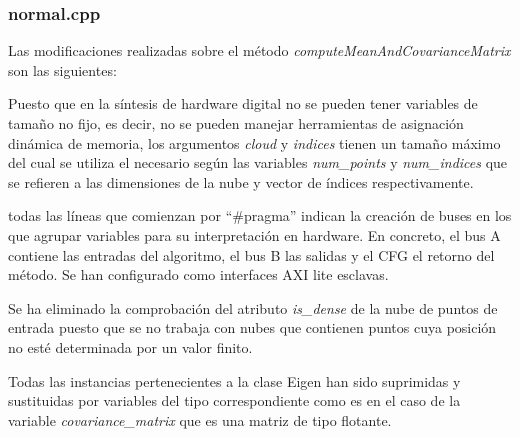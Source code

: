 \subsubsection{normal.cpp}

Las modificaciones realizadas sobre el método \textit{computeMeanAndCovarianceMatrix} son las siguientes:

\begin{list}{•}
\item Puesto que en la síntesis de hardware digital no se pueden tener variables de tamaño no fijo, es decir, no se pueden manejar herramientas de asignación dinámica de memoria, los argumentos \textit{cloud} y \textit{indices} tienen un tamaño máximo del cual se utiliza el necesario según las variables \textit{num\_points} y \textit{num\_indices} que se refieren a las dimensiones de la nube y vector de índices respectivamente.
\item todas las líneas que comienzan por ``\#pragma'' indican la creación de buses en los que agrupar variables para su interpretación en hardware. En concreto, el bus A contiene las entradas del algoritmo, el bus B las salidas y el CFG el retorno del método. Se han configurado como interfaces AXI lite esclavas.

\item Se ha eliminado la comprobación del atributo \textit{is\_dense} de la nube de puntos de entrada puesto que se no trabaja con nubes que contienen puntos cuya posición no esté determinada por un valor finito.

\item Todas las instancias pertenecientes a la clase Eigen han sido suprimidas y sustituidas por variables del tipo correspondiente como es en el caso de la variable \textit{covariance\_matrix} que es una matriz de tipo flotante.

\end{list}

